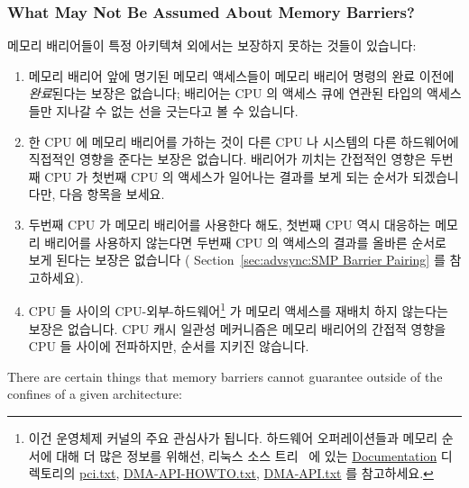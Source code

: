 \begin{enumerate}
\subsubsection{What May Not Be Assumed About Memory Barriers?}
\label{sec:advsync:What May Not Be Assumed About Memory Barriers?}

메모리 배리어들이 특정 아키텍쳐 외에서는 보장하지 못하는 것들이 있습니다:

\begin{enumerate}
\item	메모리 배리어 앞에 명기된 메모리 액세스들이 메모리 배리어 명령의 완료
	이전에 \emph{완료}된다는 보장은 없습니다; 배리어는 CPU 의 액세스 큐에
	연관된 타입의 액세스들만 지나갈 수 없는 선을 긋는다고 볼 수 있습니다.
\item	한 CPU 에 메모리 배리어를 가하는 것이 다른 CPU 나 시스템의 다른
	하드웨어에 직접적인 영향을 준다는 보장은 없습니다.
	배리어가 끼치는 간접적인 영향은 두번째 CPU 가 첫번째 CPU 의 액세스가
	일어나는 결과를 보게 되는 순서가 되겠습니다만, 다음 항목을 보세요.
\item	두번째 CPU 가 메모리 배리어를 사용한다 해도, 첫번째 CPU 역시 대응하는
	메모리 배리어를 사용하지 않는다면 두번째 CPU 의 액세스의 결과를 올바른
	순서로 보게 된다는 보장은 없습니다 (
	Section~\ref{sec:advsync:SMP Barrier Pairing} 를 참고하세요).
\item	CPU 들 사이의 CPU-외부-하드웨어\footnote{
		이건 운영체제 커널의 주요 관심사가 됩니다.
		하드웨어 오퍼레이션들과 메모리 순서에 대해 더 많은 정보를
		위해선, 리눅스 소스 트리~\cite{Torvalds2.6kernel} 에 있는
		\url{Documentation} 디렉토리의 \url{pci.txt},
		\url{DMA-API-HOWTO.txt}, \url{DMA-API.txt} 를 참고하세요.}
	가 메모리 액세스를 재배치 하지 않는다는 보장은 없습니다.
	CPU 캐시 일관성 메커니즘은 메모리 배리어의 간접적 영향을 CPU 들 사이에
	전파하지만, 순서를 지키진 않습니다.
\end{enumerate}
\iffalse

There are certain things that memory barriers cannot guarantee outside
of the confines of a given architecture:


\end{enumerate}
